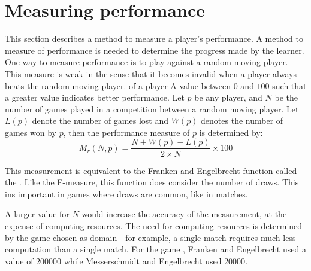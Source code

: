 \section{Measuring performance}
\label{sec:learning-performance}
This section describes a method to measure a player's performance. A method to measure of performance is needed to determine the progress made by the learner.  One way to measure performance is to play against a random moving player.  This measure is weak in the sense that it becomes invalid when a player always beats the random moving player.    
 {of a player} {A value between $0$ and $100$ such that a greater value indicates better performance.
   Let $p$ be any player, and $N$ be the number of games played in a competition between a random moving player. Let $L(p)$ denote the number of games lost and $W(p)$ denotes the number of games won by $p$, then the performance measure of $p$ is determined by:
\begin{equation}
	M_r(N,p) =  \frac{N + W(p) - L(p)}{2 \times N} \times 100
	\label{eq:performance}
\end{equation}
}

This measurement is equivalent to the Franken and Engelbrecht \cite{franken:checkers} function called the .  Like the F-measure, this function does consider the number of draws. This ins important in games where draws are common, like in  matches. 

A larger value for $N$ would increase the accuracy of the measurement, at the expense of computing resources. The need for computing resources is determined by the game chosen as domain - for example, a single  match requires much less computation than a single  match. For the game , Franken and Engelbrecht \cite{franken:checkers} used a value of $200000$ while Messerschmidt and Engelbrecht \cite{messerschmidt:learning} used $20000$.      

